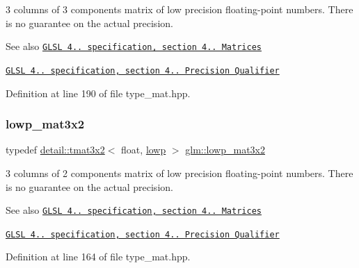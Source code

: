 3 columns of 3 components matrix of low precision floating-\/point numbers. There is no guarantee on the actual precision.

\begin{DoxySeeAlso}{See also}
\href{http://www.opengl.org/registry/doc/GLSLangSpec.4.20.8.pdf}{\tt G\+L\+SL 4.. specification, section 4.. Matrices} 

\href{http://www.opengl.org/registry/doc/GLSLangSpec.4.20.8.pdf}{\tt G\+L\+SL 4.. specification, section 4.. Precision Qualifier} 
\end{DoxySeeAlso}


Definition at line 190 of file type\+\_\+mat.\+hpp.

\mbox{\label{group__core__precision_ga17219f89f804dbf4620d4caacf32cfe2}} 
\subsubsection{\texorpdfstring{lowp\+\_\+mat3x2}{lowp\_mat3x2}}
{\footnotesize\ttfamily typedef \hyperlink{structglm_1_1detail_1_1tmat3x2}{detail\+::tmat3x2}$<$ float, \hyperlink{namespaceglm_a0f04f086094c747d227af4425893f545ae161af3fc695e696ce3bf69f7332bc2d}{lowp} $>$ \hyperlink{group__core__precision_ga17219f89f804dbf4620d4caacf32cfe2}{glm\+::lowp\+\_\+mat3x2}}

3 columns of 2 components matrix of low precision floating-\/point numbers. There is no guarantee on the actual precision.

\begin{DoxySeeAlso}{See also}
\href{http://www.opengl.org/registry/doc/GLSLangSpec.4.20.8.pdf}{\tt G\+L\+SL 4.. specification, section 4.. Matrices} 

\href{http://www.opengl.org/registry/doc/GLSLangSpec.4.20.8.pdf}{\tt G\+L\+SL 4.. specification, section 4.. Precision Qualifier} 
\end{DoxySeeAlso}


Definition at line 164 of file type\+\_\+mat.\+hpp.

\mbox{\label{group__core__precision_ga31688b397d10806ead332c3adb7dc0f0}} 
